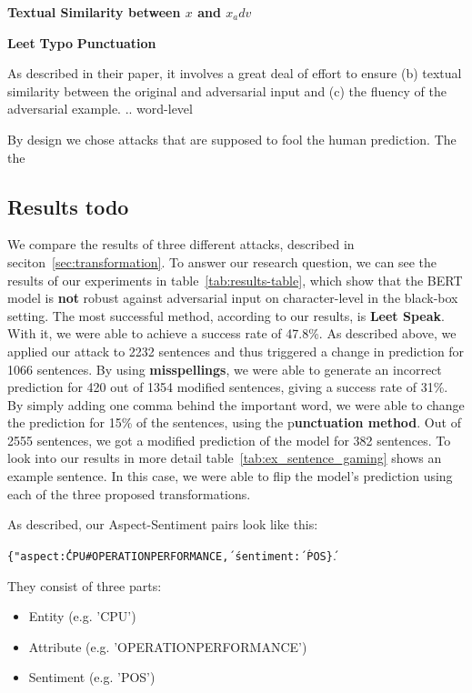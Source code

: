 \textbf{Textual Similarity between $x$ and $x_adv$}

\textbf{Leet}
\textbf{Typo}
\textbf{Punctuation}


As described in their paper, it involves a great deal of effort to ensure (b) textual similarity between the original and adversarial input and (c) the fluency of the adversarial example.
.. word-level

By design we chose attacks that are supposed to fool the human prediction. The the

\subsection{Results todo}
We compare the results of three different attacks, described in seciton~\ref{sec:transformation}. To answer our research question, we can see the results of our experiments in table~\ref{tab:results-table}, which show that the BERT model is \textbf{not} robust against adversarial input on character-level in the black-box setting.
The most successful method, according to our results, is \textbf{Leet Speak}. With it, we were able to achieve a success rate of 47.8\%. As described above, we applied our attack to 2232 sentences and thus triggered a change in prediction for 1066 sentences. By using \textbf{misspellings}, we were able to generate an incorrect prediction for 420 out of 1354 modified sentences, giving a success rate of 31\%. By simply adding one comma behind the important word, we were able to change the prediction for 15\% of the sentences, using the p\textbf{unctuation method}.  Out of 2555 sentences, we got a modified prediction of the model for 382 sentences.
To look into our results in more detail table~\ref{tab:ex_sentence_gaming} shows an example sentence. In this case, we were able to flip the model's prediction using each of the three proposed transformations.

As described, our Aspect-Sentiment pairs look like this:

\texttt{\{"aspect\':\'CPU\#OPERATION\textunderscore PERFORMANCE\', \'sentiment\': \'POS\'\}}.

They consist of three parts:
\begin{itemize}
\item Entity (e.g. 'CPU')
\item Attribute (e.g. 'OPERATION\textunderscore PERFORMANCE')
\item Sentiment (e.g. 'POS')
\end{itemize}

